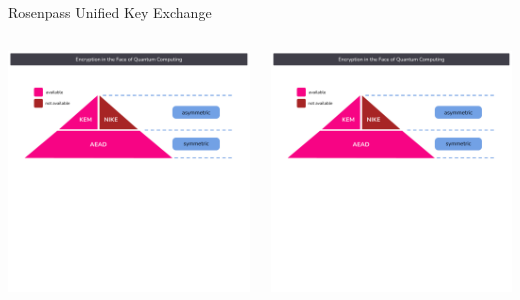 \begin{frame}{Rosenpass Unified Key Exchange}
  \hypertarget{rosenpass-flow-unified}{}
  \centering
  \begin{columns}[fullwidth,c]
    \begin{column}{.6\linewidth}
      \includegraphics[width=1.3\linewidth,page=7,clip=true,trim=1cm 4cm 0cm 2cm]{graphics/rosenpass-key-exchanges-nike-kem.pdf}
    \end{column}%

    \begin{column}{.4\linewidth}
      \includegraphics[width=\linewidth,page=5,clip=true,trim=3cm 7cm 0cm 3.5cm]{graphics/rosenpass-key-exchanges-nike-kem.pdf}
    \end{column}
  \end{columns}
\end{frame}

